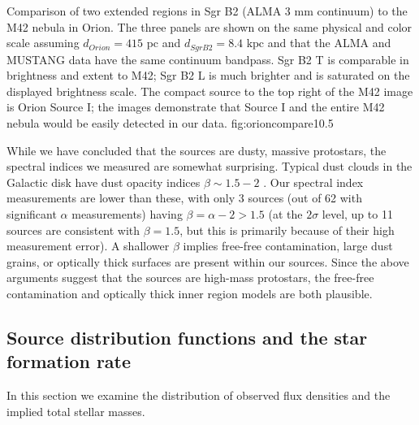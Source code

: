 \documentclass[twocolumn]{aastex61}
\newcommand{\dsgrb}{\ensuremath{8.4\textrm{~kpc}}\xspace}
\begin{document}
{Comparison of two extended \hii regions in Sgr B2 (ALMA 3 mm continuum) to the
M42 \citep[GBT MUSTANG 3 mm continuum;][]{Dicker2009a} nebula in Orion.
The three panels are shown on the same physical and color scale assuming
$d_{Orion} = 415$ pc and $d_{Sgr B2} = $\dsgrb and that the ALMA and MUSTANG
data have the same continuum bandpass.  Sgr B2 \hii T is comparable in
brightness and extent to M42; Sgr B2 \hii L is much brighter and is saturated
on the displayed brightness scale.  The compact source to the top right of the
M42 image is Orion Source I; the images demonstrate that Source I and the entire
M42 nebula would be easily detected in our data.
}
{fig:orioncompare}{1}{0.5\textwidth}

While we have concluded that the sources are dusty, massive protostars, the
spectral indices we measured are somewhat surprising.  Typical dust clouds in
the Galactic disk have dust opacity indices $\beta\sim1.5-2$
\citep{Schnee2010a,Shirley2011a,Sadavoy2016a}.  Our spectral index measurements
are lower
than these, with only 3 sources (out of 62 with significant $\alpha$
measurements) having $\beta=\alpha-2 > 1.5$ (at the
$2\sigma$ level, up to 11 sources are consistent with $\beta=1.5$, but this is
primarily because of their high measurement error).  A shallower $\beta$
implies free-free contamination, large dust grains, or optically thick surfaces
are present within our sources.  Since the above arguments suggest that the
sources are high-mass protostars, the free-free contamination and optically
thick inner region models are both plausible.

\subsection{Source distribution functions and the star formation rate}
\label{sec:distributionsandsfr}

In this section we examine the distribution of observed flux densities and the
implied total stellar masses.  

\end{document}
